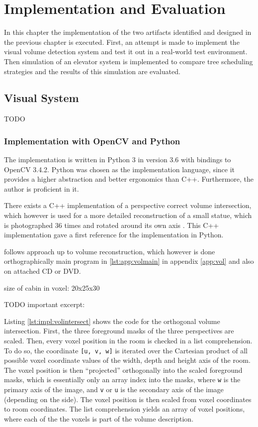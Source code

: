 \chapter{Implementation and Evaluation}
\label{chap:impl}

In this chapter the implementation of the two artifacts identified and designed in the previous chapter is executed.
First, an attempt is made to implement the visual volume detection system and test it out in a real-world test environment.
Then simulation of an elevator system is implemented to compare tree scheduling strategies and the results of this simulation are evaluated.


\section{Visual System}
TODO
\subsection{Implementation with OpenCV and Python}

The implementation is written in Python 3 in version 3.6 \autocite[][]{python2018python366}
with bindings to OpenCV 3.4.2.
Python was chosen as the implementation language, since it provides a higher abstraction and better ergonomics than C++.
Furthermore, the author is proficient in it.

There exists a C++ implementation of a perspective correct volume intersection, which however is used for a more detailed reconstruction of a small statue, which is photographed 36 times and rotated around its own axis \autocite[][]{xocoatzin2013voxelcarving}.
This C++ implementation gave a first reference for the implementation in Python.

follows approach up to volume reconstruction, which however is done orthographically
main program in \ref{lst:app:volmain} in appendix \ref{app:vol} and also on attached CD or DVD.

size of cabin in voxel: 20x25x30

TODO
important excerpt:

Listing \ref{lst:impl:volintersect} shows the code for the orthogonal volume intersection.
First, the three  foreground masks of the three perspectives are scaled.
Then, every voxel position in the room is checked in a list comprehension.
To do so, the coordinate \texttt{[u, v, w]} is iterated over the Cartesian product 
of all possible voxel coordinate values of the width, depth and height axis of the room.
The voxel position is then \enquote{projected} orthogonally into the scaled foreground masks, which is essentially only an array index into the masks, where \texttt{w} is the primary axis of the image, and \texttt{v} or \texttt{u} is the secondary axis of the image (depending on the side).
The voxel position is then scaled from voxel coordinates to room coordinates.
The list comprehension yields an array of voxel positions, where each of the the voxels is part of the volume description.

